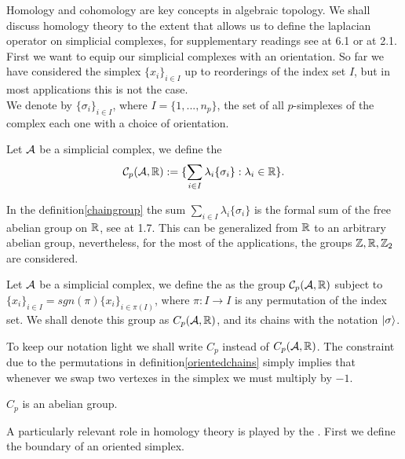 \documentclass[../1.tex]{subfiles}
\begin{document}
    Homology and cohomology are key concepts in algebraic topology. We shall discuss homology theory to the extent
    that allows us to define the laplacian operator on simplicial complexes, for supplementary readings see \cite{singerthorpe} at 6.1 or \cite{hatcher} at 2.1.
    First we want to equip our simplicial complexes with an orientation. So far we have considered the simplex $\{x_i\}_{i \in I}$ up to reorderings of the index set $I$, but in most applications this is not the case.\\
   
    We denote by $\{\sigma_i\}_{i \in I}$, where $I = \{1,...,n_p\}$, the set of all $p$-simplexes of the complex each one with a choice
    of orientation.

    \begin{defn}
        \label{chaingroup}
        Let $\mathcal{A}$ be a simplicial complex, we define the  
        \[ \mathcal{C}_p(\mathcal{A},\mathbb{R}) := \{ \sum_{i \in I} \lambda_i \{\sigma_i\} : \lambda_i \in \mathbb{R} \}.\]
    \end{defn}
    In the definition\autoref{chaingroup} the sum $\sum_{i \in I} \lambda_i \{\sigma_i\}$ is the formal sum of the free abelian group on $\mathbb{R}$, see \cite{lang} at 1.7.
    This can be generalized from $\mathbb{R}$ to an arbitrary abelian group, nevertheless, for the most of the applications, the groups $\mathbb{Z},\mathbb{R},\mathbb{Z}_2$ are considered. 

    \begin{defn}
        \label{orientedchains}
        Let $\mathcal{A}$ be a simplicial complex, we define the  as
        the group $\mathcal{C}_p(\mathcal{A},\mathbb{R})$ subject to $ \{x_i\}_{i \in I} = sgn(\pi)\{x_i\}_{i \in \pi(I)}$, where $\pi:I \to I$ is 
        any permutation of the index set. We shall denote this group as $C_p(\mathcal{A},\mathbb{R})$, and its chains with the notation $| \sigma \rangle$.
    \end{defn}

    To keep our notation light we shall write $C_p$ instead of $C_p(\mathcal{A},\mathbb{R})$. The constraint due to the 
    permutations in definition\autoref{orientedchains} simply implies that whenever we swap two vertexes in the simplex
    we must multiply by $-1$. 
    
    \begin{prop}
        $C_p$ is an abelian group.
    \end{prop}

    A particularly relevant role in homology theory is played by the . First we define the boundary of an oriented simplex.
\end{document}
